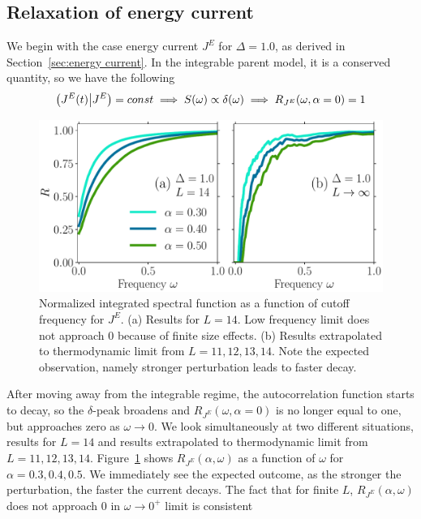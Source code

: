 \subsection{Relaxation of energy current}
We begin with the case energy current \(J^E\) for \(\Delta = 1.0\), as derived in Section~\ref{sec:energy current}.
In the integrable parent model, it is a conserved quantity, so we have the following
\begin{equation*}
  \left(J^E(t) \middle| J^E\right) = const \implies S(\omega) \propto \delta(\omega)
  \implies R_{J^E}(\omega,\alpha=0) = 1
\end{equation*}
\begin{figure}[ht]
  \centering
  \includegraphics[width=\figsize\textwidth]{Figures/current_no_scaling_small.pdf}
  \caption{Normalized integrated spectral function as a function of cutoff frequency for \(J^E\).
  (a) Results for \(L=14\). Low frequency limit does not approach 0
  because of finite size effects. (b) Results extrapolated to thermodynamic limit from \(L=11,12,13,14\).
  Note the expected observation, namely stronger perturbation leads to faster decay.}\label{fig:current decay no scaling}
\end{figure}
After moving away from the integrable regime, the autocorrelation function starts to decay,
so the \(\delta\)-peak broadens and \(R_{J^E}(\omega,\alpha=0)\) is no longer equal to one,
but approaches zero as \(\omega \to 0\). We look simultaneously at two different situations,
results for \(L=14\) and results extrapolated to thermodynamic limit from \(L=11,12,13,14\). 
Figure~\ref{fig:current decay no scaling} shows \(R_{J^E}(\alpha,\omega)\) as a
function of \(\omega\) for \(\alpha=0.3,0.4,0.5\). We immediately see the expected outcome, as the
stronger the perturbation, the faster the current decays. The fact that for finite \(L\),
\(R_{J^E}(\alpha,\omega)\) does not approach \(0\) in \(\omega\to 0^+\) limit is consistent

